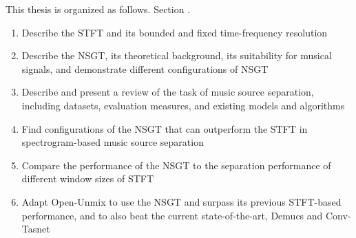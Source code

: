 \documentclass[report.tex]{subfiles}
\begin{document}
This thesis is organized as follows. Section .

\begin{enumerate}
	\item
		Describe the STFT and its bounded and fixed time-frequency resolution
	\item
		Describe the NSGT, its theoretical background, its suitability for musical signals, and demonstrate different configurations of NSGT
	\item
		Describe and present a review of the task of music source separation, including datasets, evaluation measures, and existing models and algorithms
	\item
		Find configurations of the NSGT that can outperform the STFT in spectrogram-based music source separation
	\item
		Compare the performance of the NSGT to the separation performance of different window sizes of STFT
	\item
		Adapt Open-Unmix to use the NSGT and surpass its previous STFT-based performance, and to also beat the current state-of-the-art, Demucs and Conv-Tasnet \cite{demucs}
\end{enumerate}
\end{document}
